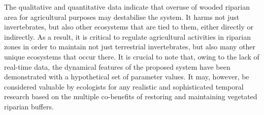 \documentclass[12pt,a4wide]{report}
\numberwithin{equation}{chapter}
\numberwithin{theorem}{chapter}
\begin{document}
   The qualitative and quantitative data indicate that overuse of wooded riparian area for agricultural purposes may destabilise the system. It harms not just invertebrates, but also other ecosystems that are tied to them, either directly or indirectly. As a result, it is critical to regulate agricultural activities in riparian zones in order to maintain not just terrestrial invertebrates, but also many other unique ecosystems that occur there. It is crucial to note that, owing to the lack of real-time data, the dynamical features of the proposed system have been demonstrated with a hypothetical set of parameter values. It may, however, be considered valuable by ecologists for any realistic and sophisticated temporal research based on the multiple co-benefits of restoring and maintaining vegetated riparian buffers.
\clearpage

\end{document}
